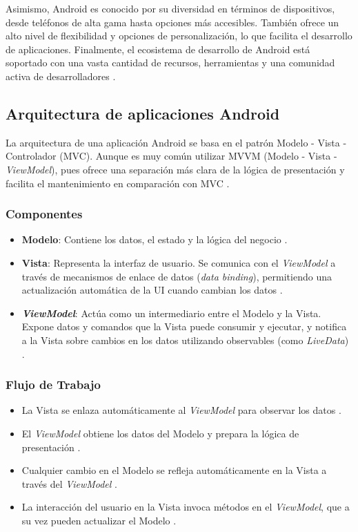 Asimismo, Android es conocido por su diversidad en términos de dispositivos, desde teléfonos de alta gama hasta opciones más accesibles. También ofrece un alto nivel de flexibilidad y opciones de personalización, lo que facilita el desarrollo de aplicaciones. Finalmente, el ecosistema de desarrollo de Android está soportado con una vasta cantidad de recursos, herramientas y una comunidad activa de desarrolladores \cite{AnonimoAndroid}.

\subsection{Arquitectura de aplicaciones Android}
La arquitectura de una aplicación Android se basa en el patrón Modelo - Vista - Controlador (MVC). Aunque es muy común utilizar MVVM (Modelo - Vista - \textit{ViewModel}), pues ofrece una separación más clara de la lógica de presentación y facilita el mantenimiento en comparación con MVC \cite{RamosSF}.

\subsubsection{Componentes}
\begin{itemize}
    \item \textbf{Modelo}: Contiene los datos, el estado y la lógica del negocio \cite{Bhadoria2013}.
    \item \textbf{Vista}: Representa la interfaz de usuario. Se comunica con el \textit{ViewModel} a través de mecanismos de enlace de datos (\textit{data binding}), permitiendo una actualización automática de la UI cuando cambian los datos \cite{Bhadoria2013}.
    \item \textbf{\textit{ViewModel}}: Actúa como un intermediario entre el Modelo y la Vista. Expone datos y comandos que la Vista puede consumir y ejecutar, y notifica a la Vista sobre cambios en los datos utilizando observables (como \textit{LiveData}) \cite{Bhadoria2013}.
\end{itemize}

\subsubsection{Flujo de Trabajo}
\begin{itemize}
    \item La Vista se enlaza automáticamente al \textit{ViewModel} para observar los datos \cite{Bhadoria2013}.
    \item El \textit{ViewModel} obtiene los datos del Modelo y prepara la lógica de presentación \cite{Bhadoria2013}.
    \item Cualquier cambio en el Modelo se refleja automáticamente en la Vista a través del \textit{ViewModel} \cite{Bhadoria2013}.
    \item La interacción del usuario en la Vista invoca métodos en el \textit{ViewModel}, que a su vez pueden actualizar el Modelo \cite{Bhadoria2013}.
\end{itemize}

